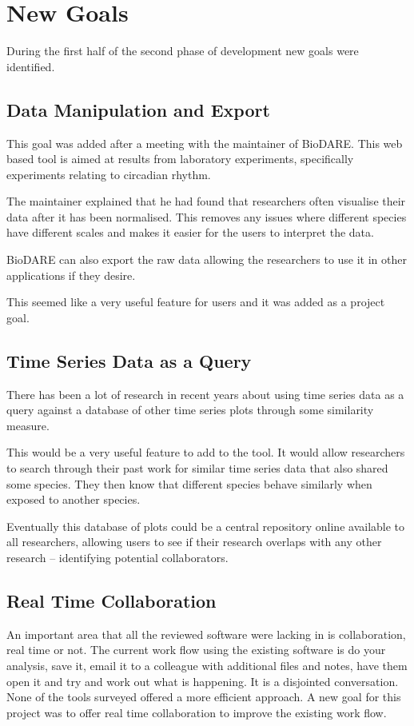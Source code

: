 \section{New Goals}
During the first half of the second phase of development new goals were identified.

\subsection{Data Manipulation and Export}

This goal was added after a meeting with the maintainer of BioDARE.  This web based tool is aimed at results from laboratory experiments, specifically experiments relating to circadian rhythm.

The maintainer explained that he had found that researchers often visualise their data after it has been normalised.  This removes any issues where different species have different scales and makes it easier for the users to interpret the data.

BioDARE can also export the raw data allowing the researchers to use it in other applications if they desire.

This seemed like a very useful feature for users and it was added as a project goal.

\subsection{Time Series Data as a Query}

There has been a lot of research in recent years about using time series data as a query against a database of other time series plots through some similarity measure.

This would be a very useful feature to add to the tool.  It would allow researchers to search through their past work for similar time series data that also shared some species. They then know that different species behave similarly when exposed to another species.

Eventually this database of plots could be a central repository online available to all researchers, allowing users to see if their research overlaps with any other research -- identifying potential collaborators.

\subsection{Real Time Collaboration}

An important area that all the reviewed software were lacking in is collaboration, real time or not.  The current work flow using the existing software is do your analysis, save it, email it to a colleague with additional files and notes, have them open it and try and work out what is happening.  It is a disjointed conversation.  None of the tools surveyed offered a more efficient approach.  A new goal for this project was to offer real time collaboration to improve the existing work flow.
